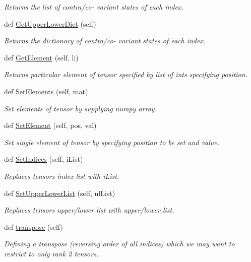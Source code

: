 \begin{DoxyCompactItemize}
\begin{DoxyCompactList}\small\item\em Returns the list of contra/co-\/ variant states of each index. \end{DoxyCompactList}\item 
def \hyperlink{class_py_spinor_1_1_tensor_1_1_tensor_a1d741384d227a9eeec15ba61685fa436}{Get\+Upper\+Lower\+Dict} (self)
\begin{DoxyCompactList}\small\item\em Returns the dictionary of contra/co-\/ variant states of each index. \end{DoxyCompactList}\item 
def \hyperlink{class_py_spinor_1_1_tensor_1_1_tensor_aeb9b9d580cc278d3d82c3ae6e170e162}{Get\+Element} (self, li)
\begin{DoxyCompactList}\small\item\em Returns particular element of tensor specified by list of ints specifying position. \end{DoxyCompactList}\item 
def \hyperlink{class_py_spinor_1_1_tensor_1_1_tensor_ad3a6e9e20ed888185d1d7a694dcc3656}{Set\+Elements} (self, mat)
\begin{DoxyCompactList}\small\item\em Set elements of tensor by supplying numpy array. \end{DoxyCompactList}\item 
def \hyperlink{class_py_spinor_1_1_tensor_1_1_tensor_a56f26c888dd2c432bbdd90393efc7387}{Set\+Element} (self, pos, val)
\begin{DoxyCompactList}\small\item\em Set single element of tensor by specifying position to be set and value. \end{DoxyCompactList}\item 
def \hyperlink{class_py_spinor_1_1_tensor_1_1_tensor_ac54f08172b7bd55dd4d072089bed4128}{Set\+Indices} (self, i\+List)
\begin{DoxyCompactList}\small\item\em Replaces tensor\textquotesingle{}s index list with i\+List. \end{DoxyCompactList}\item 
def \hyperlink{class_py_spinor_1_1_tensor_1_1_tensor_adb159fcd1553f03294fb0e50896b70cb}{Set\+Upper\+Lower\+List} (self, ul\+List)
\begin{DoxyCompactList}\small\item\em Replaces tensor\textquotesingle{}s upper/lower list with upper/lower list. \end{DoxyCompactList}\item 
def \hyperlink{class_py_spinor_1_1_tensor_1_1_tensor_ac895b7ec88503743bfa53d083c2d79e0}{transpose} (self)
\begin{DoxyCompactList}\small\item\em Defining a transpose (reversing order of all indices) which we may want to restrict to only rank 2 tensors. \end{DoxyCompactList}\end{DoxyCompactItemize}
